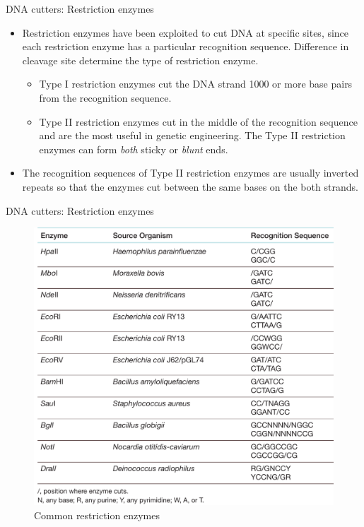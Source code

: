 \documentclass[ignorenonframetext,aspectratio=169]{beamer}
\providecommand{\tightlist}{%
  \setlength{\itemsep}{0pt}\setlength{\parskip}{0pt}}
\begin{document}
\begin{frame}{DNA cutters: Restriction enzymes}
\protect\hypertarget{dna-cutters-restriction-enzymes-2}{}

\begin{itemize}
\item
  Restriction enzymes have been exploited to cut DNA at specific sites,
  since each restriction enzyme has a particular recognition sequence.
  Difference in cleavage site determine the type of restriction enzyme.

  \begin{itemize}
  \tightlist
  \item
    Type I restriction enzymes cut the DNA strand 1000 or more base
    pairs from the recognition sequence.
  \item
    Type II restriction enzymes cut in the middle of the recognition
    sequence and are the most useful in genetic engineering. The Type II
    restriction enzymes can form \emph{both} sticky or \emph{blunt}
    ends.
  \end{itemize}
\item
  The recognition sequences of Type II restriction enzymes are usually
  inverted repeats so that the enzymes cut between the same bases on the
  both strands.
\end{itemize}

\end{frame}

\begin{frame}{DNA cutters: Restriction enzymes}
\protect\hypertarget{dna-cutters-restriction-enzymes-3}{}

\begin{figure}
\includegraphics[width=0.5\linewidth]{./../images/restriction_enzymes_ex} \caption{Common restriction enzymes}\label{fig:restriction-enzymes-ex}
\end{figure}

\end{frame}
\end{document}
